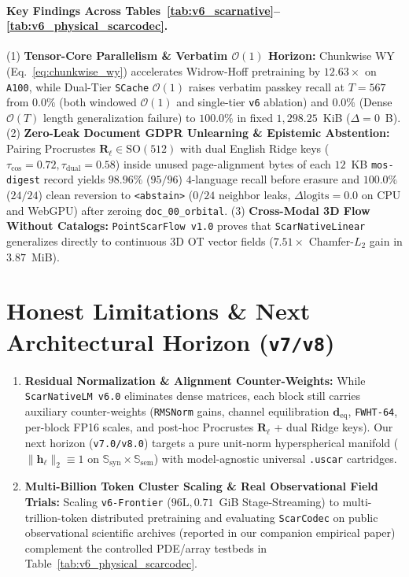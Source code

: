 \documentclass[10pt,twocolumn]{article}
\begin{document}
\paragraph{Key Findings Across Tables~\ref{tab:v6_scarnative}--\ref{tab:v6_physical_scarcodec}.}
(1) \textbf{Tensor-Core Parallelism \& Verbatim $\mathcal{O}(1)$ Horizon:} Chunkwise WY (Eq.~\ref{eq:chunkwise_wy}) accelerates Widrow-Hoff pretraining by $12.63\times$ on \texttt{A100}, while Dual-Tier \texttt{SCache} $\mathcal{O}(1)$ raises verbatim passkey recall at $T=567$ from $0.0\%$ (both windowed $\mathcal{O}(1)$ and single-tier \texttt{v6} ablation) and $0.0\%$ (Dense $\mathcal{O}(T)$ length generalization failure) to $\mathbf{100.0\%}$ in fixed $1{,}298.25$~KiB ($\Delta=0$~B).
(2) \textbf{Zero-Leak Document GDPR Unlearning \& Epistemic Abstention:} Pairing Procrustes $\mathbf{R}_\ell \in \mathrm{SO}(512)$ with dual English Ridge keys ($\tau_{\text{cos}}=0.72, \tau_{\text{dual}}=0.58$) inside unused page-alignment bytes of each $12$~KB \texttt{mos-digest} record yields $98.96\%$ ($95/96$) $4$-language recall before erasure and $\mathbf{100.0\%}$ ($24/24$) clean reversion to \texttt{<abstain>} ($0/24$ neighbor leaks, $\Delta\text{logits}=0.0$ on CPU and WebGPU) after zeroing \texttt{doc\_00\_orbital}.
(3) \textbf{Cross-Modal 3D Flow Without Catalogs:} \texttt{PointScarFlow v1.0} proves that \texttt{ScarNativeLinear} generalizes directly to continuous 3D OT vector fields ($7.51\times$ Chamfer-$L_2$ gain in $3.87$~MiB).

\section{Honest Limitations \& Next Architectural Horizon (\texttt{v7/v8})}
\begin{enumerate}
    \item \textbf{Residual Normalization \& Alignment Counter-Weights:} While \texttt{ScarNativeLM v6.0} eliminates dense matrices, each block still carries auxiliary counter-weights (\texttt{RMSNorm} gains, channel equilibration $\mathbf{d}_{\text{eq}}$, \texttt{FWHT-64}, per-block FP16 scales, and post-hoc Procrustes $\mathbf{R}_\ell$ + dual Ridge keys). Our next horizon (\texttt{v7.0/v8.0}) targets a pure unit-norm hyperspherical manifold ($\|\mathbf{h}_\ell\|_2 \equiv 1$ on $\mathbb{S}_{\text{syn}} \times \mathbb{S}_{\text{sem}}$) with model-agnostic universal \texttt{.uscar} cartridges.
    \item \textbf{Multi-Billion Token Cluster Scaling \& Real Observational Field Trials:} Scaling \texttt{v6-Frontier} ($96\text{L}, 0.71$~GiB Stage-Streaming) to multi-trillion-token distributed pretraining and evaluating \texttt{ScarCodec} on public observational scientific archives (reported in our companion empirical paper) complement the controlled PDE/array testbeds in Table~\ref{tab:v6_physical_scarcodec}.
\end{enumerate}
\end{document}
